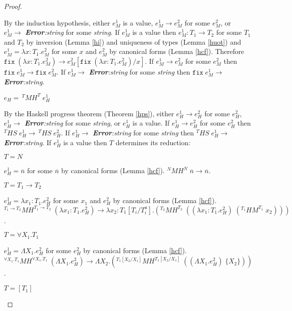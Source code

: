 \begin{mps}
\begin{proof}
\begin{mps-case-12}
By the induction hypothesis, either $e_{M}^{1}$ is a value, $e_{M}^{1}\rightarrow e_{M}^{2}$ for some $e_{M}^{2}$, or $e_{M}^{1}\rightarrow$ \emph{\textbf{Error}:\;string} for some \emph{string}.  If $e_{M}^{1}$ is a value then $e_{M}^{1}:T_{1}\rightarrow T_{2}$ for some $T_{1}$ and $T_{2}$ by inversion (Lemma \ref{hi}) and uniqueness of types (Lemma \ref{huot}) and $e_{M}^{1}=\lambda x:T_{1}.e_{M}^{2}$ for some $x$ and $e_{M}^{2}$ by canonical forms (Lemma \ref{hcf}).  Therefore $\mathtt{fix}\;(\lambda x:T_{1}.e_{M}^{2})\rightarrow e_{M}^{2}[\mathtt{fix}\;(\lambda x:T_{1}.e_{M}^{2})/x]$.  If $e_{M}^{1}\rightarrow e_{M}^{2}$ for some $e_{M}^{2}$ then $\mathtt{fix}\;e_{M}^{1}\rightarrow\mathtt{fix}\;e_{M}^{2}$.  If $e_{M}^{1}\rightarrow$ \emph{\textbf{Error}:\;string} for some \emph{string} then $\mathtt{fix}\;e_{M}^{1}\rightarrow$ \emph{\textbf{Error}:\;string}.
\end{mps-case-12}
\begin{mps-case-13}
$e_{H}=\,^{T}MH^{T}\;e_{H}^{1}$

By the Haskell progress theorem (Theorem \ref{hps}), either $e_{H}^{1}\rightarrow e_{H}^{2}$ for some $e_{H}^{2}$, $e_{H}^{1}\rightarrow$ \emph{\textbf{Error}:\;string} for some \emph{string}, or $e_{H}^{1}$ is a value.  If $e_{H}^{1}\rightarrow e_{H}^{2}$ for some $e_{H}^{2}$ then $^{T}HS\;e_{H}^{1}\rightarrow\,^{T}HS\;e_{H}^{2}$.  If $e_{H}^{1}\rightarrow$ \emph{\textbf{Error}:\;string} for some \emph{string} then $^{T}HS\;e_{H}^{1}\rightarrow$ \emph{\textbf{Error}:\;string}.  If $e_{H}^{1}$ is a value then $T$ determines its reduction:
\begin{mps-case-13-1}
$T=N$

$e_{H}^{1}=\overline{n}$ for some $\overline{n}$ by canonical forms (Lemma \ref{hcf}).  $^{N}MH^{N}\;\overline{n}\rightarrow\overline{n}$.
\end{mps-case-13-1}
\begin{mps-case-13-2}
$T=T_{1}\rightarrow T_{2}$

$e_{H}^{1}=\lambda x_{1}:T_{1}.e_{H}^{2}$ for some $x_{1}$ and $e_{H}^{2}$ by canonical forms (Lemma \ref{hcf}).  $^{T_{1}\rightarrow T_{2}}MH^{T_{1}\rightarrow T_{2}}\;(\lambda x_{1}:T_{1}.e_{H}^{2})\rightarrow\lambda x_{2}:T_{1}[T_{i}/T^{a}_{i}].(^{T_{2}}MH^{T_{2}}\;((\lambda x_{1}:T_{1}.e_{H}^{2})\;(^{T_{1}}HM^{T_{1}}\;x_{2})))$.
\end{mps-case-13-2}
\begin{mps-case-13-3}
$T=\forall X_{1}.T_{1}$

$e_{H}^{1}=\Lambda X_{1}.e_{H}^{2}$ for some $e_{H}^{2}$ by canonical forms (Lemma \ref{hcf}).  $^{\forall X_{1}.T_{1}}MH^{\forall X_{1}.T_{1}}\;(\Lambda X_{1}.e_{H}^{2})\rightarrow\Lambda X_{2}.(^{T_{1}[X_{2}/X_{1}]}MH^{T_{1}[X_{2}/X_{1}]}\;((\Lambda X_{1}.e_{H}^{2})\;\lbrace X_{2}\rbrace))$.
\end{mps-case-13-3}
\begin{mps-case-13-4}
$T=[T_{1}]$


\end{mps-case-13-4}
\end{mps-case-13}
\end{proof}
\end{mps}
